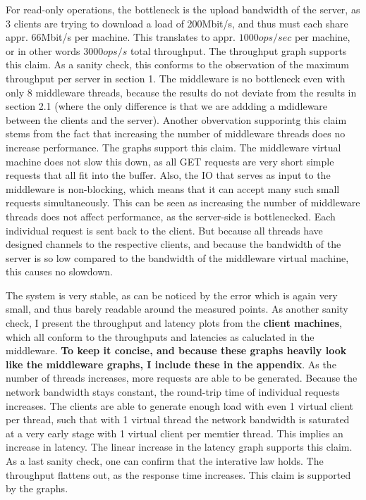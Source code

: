 \documentclass[11pt,a4paper]{article}
\begin{document}
For read-only operations, the bottleneck is the upload bandwidth of the server,
as 3 clients are trying to download a load of 200Mbit/s, and thus must each share appr. 66Mbit/s per machine.
This translates to appr. $1000 ops/sec$ per machine, or in other words $3000ops/s$ total throughput.
The throughput graph supports this claim.
As a sanity check, this conforms to the observation of the maximum throughput per server in section 1.
The middleware is no bottleneck even with only 8 middleware threads, because the results do not deviate from the results in section 2.1 (where the only difference is that we are addding a mdidleware between the clients and the server).
Another obvervation supporintg this claim stems from the fact that increasing the number of middleware threads does no increase performance.
The graphs support this claim.
The middleware virtual machine does not slow this down, as all GET requests are very short simple requests that all fit into the buffer.
Also, the IO that serves as input to the middleware is non-blocking, which means that it can accept many such small requests simultaneously.
This can be seen as increasing the number of middleware threads does not affect performance, as the server-side is bottlenecked.
Each individual request is sent back to the client. 
But because all threads have designed channels to the respective clients, and because the bandwidth of the server is so low compared to the bandwidth of the middleware virtual machine, this causes no slowdown.

The system is very stable, as can be noticed by the error which is again very small, and thus barely readable around the measured points.
As another sanity check, I present the throughput and latency plots from the \textbf{client machines}, which all conform to the throughputs and latencies as caluclated in the middleware.
\textbf{To keep it concise, and because these graphs heavily look like the middleware graphs, I include these in the appendix}. 
As the number of threads increases, more requests are able to be generated.
Because the network bandwidth stays constant, the round-trip time of individual requests increases.
The clients are able to generate enough load with even 1 virtual client per thread, such that with 1 virtual thread the network bandwidth is saturated at a very early stage with 1 virtual client per memtier thread.
This implies an increase in latency.
The linear increase in the latency graph supports this claim.
As a last sanity check, one can confirm that the interative law holds.
The throughput flattens out, as the response time increases.
This claim is supported by the graphs.
\end{document}
